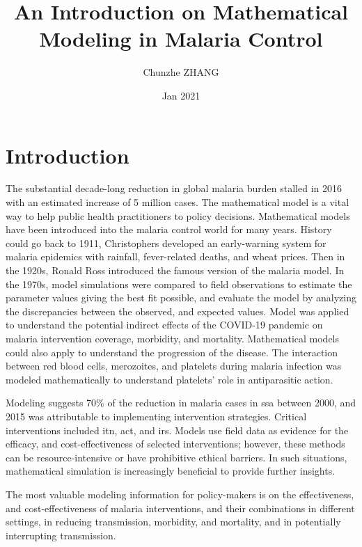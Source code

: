 \documentclass[a4paper, 12pt, twoside]{article}
\title{An Introduction on Mathematical Modeling in Malaria Control}
\author{Chunzhe ZHANG}
\date{Jan 2021}
\begin{document}
\begin{titlepage}
	\maketitle
\end{titlepage}

\tableofcontents

\section{Introduction}
The substantial decade-long reduction in global malaria burden stalled in 2016 with an estimated increase of 5 million cases.
The mathematical model is a vital way to help public health practitioners to policy decisions.
Mathematical models have been introduced into the malaria control world for many years.
History could go back to 1911, Christophers\cite{christophers1911epidemic} developed an early-warning system for malaria epidemics with rainfall, fever-related deaths, and wheat prices.
Then in the 1920s, Ronald Ross introduced the famous version of the malaria model.
In the 1970s, model simulations were compared to field observations to estimate the parameter values giving the best fit possible, and evaluate the model by analyzing the discrepancies between the observed, and expected values\cite{dietz1974}.
Model\cite{Weiss2020e} was applied to understand the potential indirect effects of the COVID-19 pandemic on malaria intervention coverage, morbidity, and mortality.
Mathematical models could also apply to understand the progression of the disease.
The interaction between red blood cells, merozoites, and platelets during malaria infection was modeled mathematically\cite{Alves2021} to understand platelets' role in antiparasitic action.

Modeling suggests 70\% of the reduction in malaria cases in \gls{ssa} between 2000, and 2015 was attributable to implementing intervention strategies.
Critical interventions included \gls{itn}, \gls{act}, and \gls{irs}.
Models use field data as evidence for the efficacy, and cost-effectiveness of selected interventions; however, these methods can be resource-intensive or have prohibitive ethical barriers.
In such situations, mathematical simulation is increasingly beneficial to provide further insights.

The most valuable modeling information for policy-makers is on the effectiveness, and cost-effectiveness of malaria interventions, and their combinations in different settings, in reducing transmission, morbidity, and mortality, and in potentially interrupting transmission.
\end{document}
